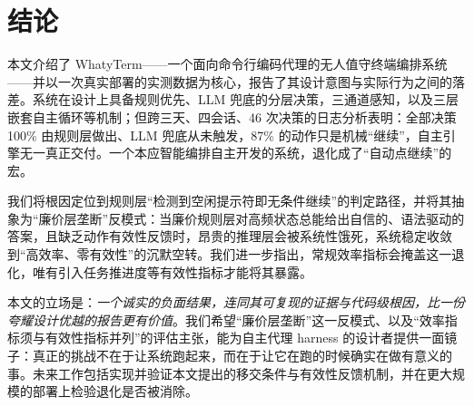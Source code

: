 \section{结论}
\label{sec:conclusion}

本文介绍了 WhatyTerm——一个面向命令行编码代理的无人值守终端编排系统——并以一次真实部署的实测数据为核心，报告了其设计意图与实际行为之间的落差。系统在设计上具备规则优先、LLM 兜底的分层决策，三通道感知，以及三层嵌套自主循环等机制；但跨三天、四会话、46 次决策的日志分析表明：全部决策 100\% 由规则层做出、LLM 兜底从未触发，87\% 的动作只是机械“继续”，自主引擎无一真正交付。一个本应智能编排自主开发的系统，退化成了“自动点继续”的宏。

我们将根因定位到规则层“检测到空闲提示符即无条件继续”的判定路径，并将其抽象为“廉价层垄断”反模式：当廉价规则层对高频状态总能给出自信的、语法驱动的答案，且缺乏动作有效性反馈时，昂贵的推理层会被系统性饿死，系统稳定收敛到“高效率、零有效性”的沉默空转。我们进一步指出，常规效率指标会掩盖这一退化，唯有引入任务推进度等有效性指标才能将其暴露。

本文的立场是：\emph{一个诚实的负面结果，连同其可复现的证据与代码级根因，比一份夸耀设计优越的报告更有价值}。我们希望“廉价层垄断”这一反模式、以及“效率指标须与有效性指标并列”的评估主张，能为自主代理 harness 的设计者提供一面镜子：真正的挑战不在于让系统跑起来，而在于让它在跑的时候确实在做有意义的事。未来工作包括实现并验证本文提出的移交条件与有效性反馈机制，并在更大规模的部署上检验退化是否被消除。
